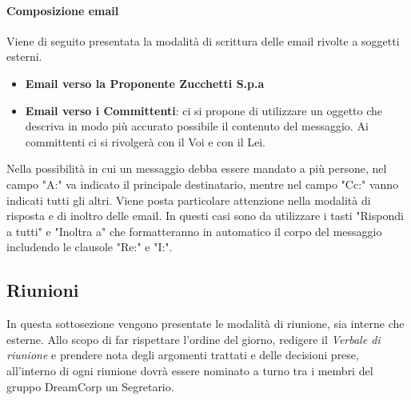             \paragraph{Composizione email}
            Viene di seguito presentata la modalità di scrittura delle email rivolte a soggetti esterni.
            \begin{itemize}
                \item \textbf{Email verso la Proponente Zucchetti S.p.a} 
                \item \textbf{Email verso i Committenti}: ci si propone di utilizzare un oggetto che descriva in modo più accurato possibile il contenuto del messaggio. Ai committenti ci si rivolgerà con il Voi e con il Lei.
            \end{itemize}
            Nella possibilità in cui un messaggio debba essere mandato a più persone, nel campo "A:" va indicato il principale destinatario, mentre nel campo "Cc:" vanno indicati tutti gli altri.
            Viene posta particolare attenzione nella modalità di risposta e di inoltro delle email. In questi casi sono da utilizzare i tasti "Rispondi a tutti" e "Inoltra a" che formatteranno in automatico il corpo del messaggio includendo le clausole "Re:" e "I:".
            \subsection{Riunioni}
                In questa sottosezione vengono presentate le modalità di riunione, sia interne che esterne.
                Allo scopo di far rispettare l'ordine del giorno, redigere il \textit{Verbale di riunione} e prendere nota degli argomenti trattati e delle decisioni prese, all'interno di ogni riunione dovrà essere nominato a turno tra i membri del gruppo DreamCorp un Segretario.
